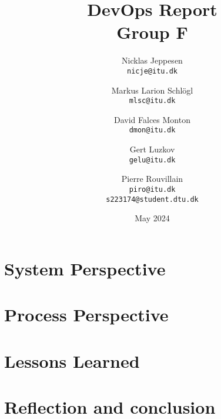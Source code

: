 \documentclass[12pt,a4paper]{report}
\title{DevOps Report\\ Group F}
\author{Nicklas Jeppesen\\ \texttt{nicje@itu.dk} \and
Markus Larion Schlögl\\ \texttt{mlsc@itu.dk} \and
David Falces Monton\\ \texttt{dmon@itu.dk} \and
Gert Luzkov \\ \texttt{gelu@itu.dk} \and
Pierre Rouvillain\\ \texttt{piro@itu.dk}\\ \texttt{s223174@student.dtu.dk}}
\date{May 2024}
\begin{document}
\maketitle
\tableofcontents
\listoffigures

\pagebreak


\chapter{System Perspective}






\chapter{Process Perspective}







\chapter{Lessons Learned}




\chapter{Reflection and conclusion}


\end{document}
